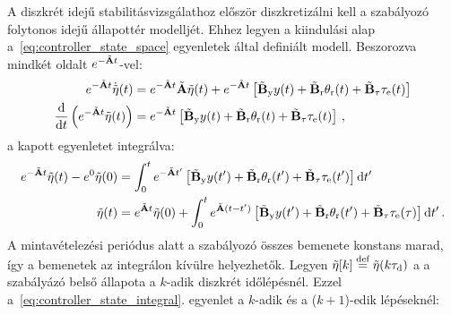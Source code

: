 A diszkrét idejű stabilitásvizsgálathoz először diszkretizálni kell a szabályozó folytonos idejű állapottér modelljét.
Ehhez legyen a kiindulási alap a~\eqref{eq:controller_state_space} egyenletek által definiált modell.
Beszorozva mindkét oldalt \(e^{-\tilde {\mathbf{A}} t}\)-vel:
\begin{align}
    \begin{split}
        e^{-\tilde {\mathbf{A}} t}\dot{\tilde{\mathbf{\eta}}}(t) &= e^{-\tilde {\mathbf{A}} t}\tilde {\mathbf{A}} \tilde{\mathbf{\eta}}(t) +
        e^{-\tilde {\mathbf{A}} t}\left[\tilde{\mathbf{B}}_{\mathrm{y}} y(t) + 
        \tilde{\mathbf{B}}_{\mathrm{r}} \theta_{\mathrm{r}}(t) +
        \tilde{\mathbf{B}}_{\mathrm{\tau}} \tau_{\mathrm{e}}(t)\right] \\
        \frac{\mathrm{d}}{\mathrm{d} t}\left(e^{-\tilde {\mathbf{A}} t}\tilde{\mathbf{\eta}}(t)\right) &= e^{-\tilde {\mathbf{A}} t}\left[\tilde{\mathbf{B}}_{\mathrm{y}} y(t) + 
        \tilde{\mathbf{B}}_{\mathrm{r}} \theta_{\mathrm{r}}(t) +
        \tilde{\mathbf{B}}_{\mathrm{\tau}} \tau_{\mathrm{e}}(t)\right]\,, 
    \end{split}        
\end{align}
a kapott egyenletet integrálva:
\begin{align}\label{eq:controller_state_integral}
    \begin{split}
        e^{-\tilde {\mathbf{A}} t}\tilde{\mathbf{\eta}}(t) - e^0 \tilde{\mathbf{\eta}}(0) &= \int_{0}^{t} e^{-\tilde {\mathbf{A}} t'}\left[\tilde{\mathbf{B}}_{\mathrm{y}} y(t') + 
        \tilde{\mathbf{B}}_{\mathrm{r}} \theta_{\mathrm{r}}(t') +
        \tilde{\mathbf{B}}_{\mathrm{\tau}} \tau_{\mathrm{e}}(t')\right] \mathrm{d}t' \\
        \tilde{\mathbf{\eta}}(t) &= e^{\tilde {\mathbf{A}} t}\tilde{\mathbf{\eta}}(0) + \int_{0}^{t} e^{\tilde {\mathbf{A}} (t-t')}\left[\tilde{\mathbf{B}}_{\mathrm{y}} y(t') + 
        \tilde{\mathbf{B}}_{\mathrm{r}} \theta_{\mathrm{r}}(t') +
        \tilde{\mathbf{B}}_{\mathrm{\tau}} \tau_{\mathrm{e}}(\tau)\right] \mathrm{d}t'\,.
    \end{split}        
\end{align}
A mintavételezési periódus alatt a szabályozó összes bemenete konstans marad, így a bemenetek az 
integrálon kívülre helyezhetők. Legyen \(\tilde{\mathbf{\eta}}[k] \stackrel{\text{def}}{=} \tilde{\mathbf{\eta}}(k\tau_{\mathrm{d}})\) a 
a szabályázó belső állapota a \(k\)-adik diszkrét időlépésnél. Ezzel a~\eqref{eq:controller_state_integral}. 
egyenlet a \(k\)-adik és a (\(k+1\))-edik lépéseknél:
